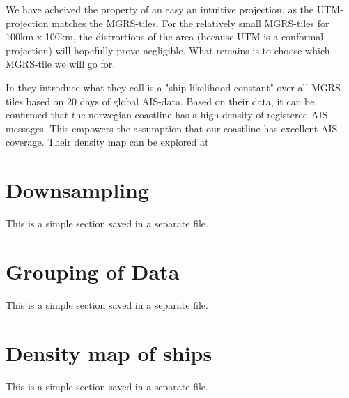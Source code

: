 We have acheived the property of an easy an intuitive projection, as the UTM-projection matches the MGRS-tiles. For the relatively small MGRS-tiles for 100km x 100km, the distrortions of the area (because UTM is a conformal projection) will hopefully prove negligible. What remains is to choose which MGRS-tile we will go for. 

In \cite{Tofting2018} they introduce what they call is a "ship likelihood constant" over all MGRS-tiles based on 20 days of global AIS-data. Based on their data, it can be confirmed that the norwegian coastline has a high density of registered AIS-messages. This empowers the assumption that our coastline has excellent AIS-coverage. Their density map can be explored at \cite{Tofting}




\section{Downsampling}
\begin{info}{}
	This is a simple section saved in a separate file.
\end{info}

\section{Grouping of Data}
\begin{info}{}
	This is a simple section saved in a separate file.
\end{info}






\section{Density map of ships}
\begin{info}{}
	This is a simple section saved in a separate file.
\end{info}





